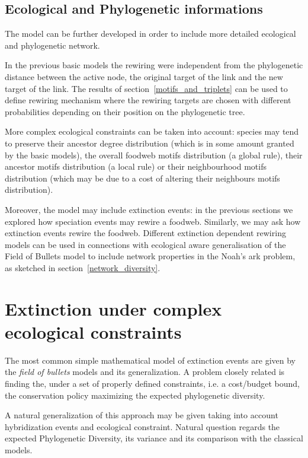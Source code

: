 \documentclass[12pt,a4paper]{report}
\begin{document}
\subsection{Ecological and Phylogenetic informations}\label{complex_model}

The model can be further developed in order to include more detailed ecological and phylogenetic network.

In the previous basic models the rewiring were independent from the phylogenetic distance between the active node, the original target of the link and the new target of the link. The results of section~\ref{motifs_and_triplets} can be used to define rewiring mechanism where the rewiring targets are chosen with different probabilities depending on their position on the phylogenetic tree.

More complex ecological constraints can be taken into account: species may tend to preserve their ancestor degree distribution (which is in some amount granted by the basic models), the overall foodweb motifs distribution (a global rule), their ancestor motifs distribution (a local rule) or their neighbourhood motifs distribution (which may be due to a cost of altering their neighbours motifs distribution).

Moreover, the model may include extinction events: in the previous sections we explored how speciation events may rewire a foodweb. Similarly, we may ask how extinction events rewire the foodweb. Different extinction dependent rewiring models can be used in connections with ecological aware generalisation of the Field of Bullets model to include network properties in the Noah's ark problem, as sketched in section~\ref{network_diversity}. 

\section{Extinction under complex ecological constraints}

The most common simple mathematical model of extinction events are given by the \emph{field of bullets} models and its generalization. A problem closely related is finding the, under a set of properly defined constraints, i.e. a cost/budget bound, the conservation policy maximizing the expected phylogenetic diversity.

A natural generalization of this approach may be given taking into account hybridization events and ecological constraint. Natural question regards the expected Phylogenetic Diversity, its variance and its comparison with the classical models.
\end{document}

